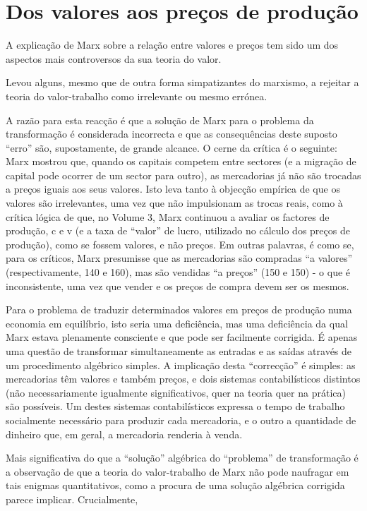 \section{Dos valores aos preços de produção}
 \par 
A explicação de Marx sobre a relação entre valores e preços tem sido um dos aspectos mais controversos da sua teoria do valor.
 \par 
Levou alguns, mesmo que de outra forma simpatizantes do marxismo, a rejeitar a teoria do valor-trabalho como irrelevante ou mesmo errónea.
 \par 
A razão para esta reacção é que a solução de Marx para o problema da transformação é considerada incorrecta e que as consequências deste suposto “erro” são, supostamente, de grande alcance. O cerne da crítica é o seguinte: Marx mostrou que, quando os capitais competem entre sectores (e a migração de capital pode ocorrer de um sector para outro), as mercadorias já não são trocadas a preços iguais aos seus valores. Isto leva tanto à objecção empírica de que os valores são irrelevantes, uma vez que não impulsionam as trocas reais, como à crítica lógica de que, no Volume 3, Marx continuou a avaliar os factores de produção, c e v (e a taxa de “valor” de lucro, utilizado no cálculo dos preços de produção), como se fossem valores, e não preços. Em outras palavras, é como se, para os críticos, Marx presumisse que as mercadorias são compradas “a valores” (respectivamente, {\color{blue}140} e {\color{blue}160}), mas são vendidas “a preços” (150 e {\color{blue}150}) - o que é inconsistente, uma vez que vender e os preços de compra devem ser os mesmos.
 \par 
Para o problema de traduzir determinados valores em preços de produção numa economia em equilíbrio, isto seria uma deficiência, mas uma deficiência da qual Marx estava plenamente consciente e que pode ser facilmente corrigida. É apenas uma questão de transformar simultaneamente as entradas e as saídas através de um procedimento algébrico simples. A implicação desta “correcção” é simples: as mercadorias têm valores e também preços, e dois sistemas contabilísticos distintos (não necessariamente igualmente significativos, quer na teoria quer na prática) são possíveis. Um destes sistemas contabilísticos expressa o tempo de trabalho socialmente necessário para produzir cada mercadoria, e o outro a quantidade de dinheiro que, em geral, a mercadoria renderia à venda.
 \par 
Mais significativa do que a “solução” algébrica do “problema” de transformação é a observação de que a teoria do valor-trabalho de Marx não pode naufragar em tais enigmas quantitativos, como a procura de uma solução algébrica corrigida parece implicar. Crucialmente,
